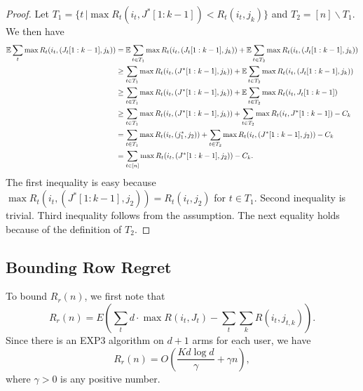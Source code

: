 \begin{proof}
 Let $T_1 = \{ t \, | \max R_t(i_t,J^*[1:k-1]) < R_t(i_t,j_k) \}$ and $T_2 = [n] \backslash T_1 .$ We then have 
\begin{align*}
\mathbb{E} \sum_t \max R_t(i_t,(J_t[1:k-1],j_k)) &= \mathbb{E}\sum_{t \in T_1} \max R_t(i_t,(J_t[1:k-1],j_k)) + \mathbb{E}\sum_{t \in T_2} \max R_t(i_t,(J_t[1:k-1],j_k)) \\
&\geq \sum_{t \in T_1} \max R_t(i_t,(J^*[1:k-1],j_k)) + \mathbb{E}\sum_{t \in T_2} \max R_t(i_t,(J_t[1:k-1],j_k)) \\
&\geq \sum_{t \in T_1} \max R_t(i_t,(J^*[1:k-1],j_k)) + \mathbb{E}\sum_{t \in T_2} \max R_t(i_t,J_t[1:k-1]) \\
&\geq \sum_{t \in T_1} \max R_t(i_t,(J^*[1:k-1],j_k)) + \sum_{t \in T_2} \max R_t(i_t,J^*[1:k-1]) - C_k \\
&= \sum_{t \in T_1} \max R_t(i_t,(j_1^*,j_2)) + \sum_{t \in T_2} \max R_t(i_t,(J^*[1:k-1],j_2)) - C_k \\
&= \sum_{t \in [n]} \max R_t(i_t,(J^*[1:k-1],j_2)) - C_k.
\end{align*}
The first inequality is easy because $\max R_t(i_t,(J^*[1:k-1],j_2)) = R_t(i_t,j_2)$ for $t \in T_1$. Second inequality is trivial. Third inequality follows from the assumption. The next equality holds because of the definition of $T_2$.  
\end{proof}


\subsection*{Bounding Row Regret}
To bound $R_r(n)$, we first note that
$$R_r(n) =  E \left( \sum_{t} d\cdot \max R(i_t,J_t)  - \sum_{t} \sum_k R(i_t,j_{t,k}) \right) .$$ 
Since there is an EXP3 algorithm on $d+1$ arms for each user, we have
$$R_r(n) = O \left( \frac{K d\log d}{\gamma} + \gamma n  \right),$$
where $\gamma >0$ is any positive number.
%
